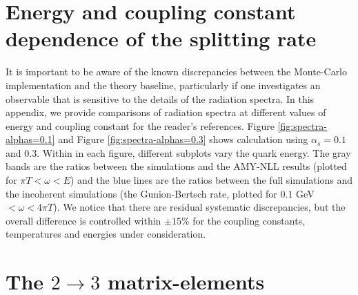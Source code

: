 \documentclass[aps, prc, reprint, amsmath, groupedaddress, nofootinbib]{revtex4-1}
\begin{document}
\begin{appendices}
\section{Energy and coupling constant dependence of the splitting rate}\label{app:tune-spectrum}
It is important to be aware of the known discrepancies between the Monte-Carlo implementation and the theory baseline, particularly if one investigates an observable that is sensitive to the details of the radiation spectra. 
In this appendix, we provide comparisons of radiation spectra at different values of energy and coupling constant for the reader's references.
Figure \ref{fig:spectra-alphas=0.1} and Figure \ref{fig:spectra-alphas=0.3} shows calculation using $\alpha_s = 0.1$ and $0.3$.
Within in each figure, different subplots vary the quark energy.
The gray bands are the ratios between the simulations and the AMY-NLL results (plotted for $\pi T < \omega < E$) and the blue lines are the ratios between the full simulations and the incoherent simulations (the Gunion-Bertsch rate, plotted for $0.1$ GeV $< \omega < 4\pi T $).
We notice that there are residual systematic discrepancies, but the overall difference is controlled within $\pm 15\%$ for the coupling constants, temperatures and energies under consideration.

\section{The $2\rightarrow 3$ matrix-elements}

\end{appendices}
 
\end{document}
